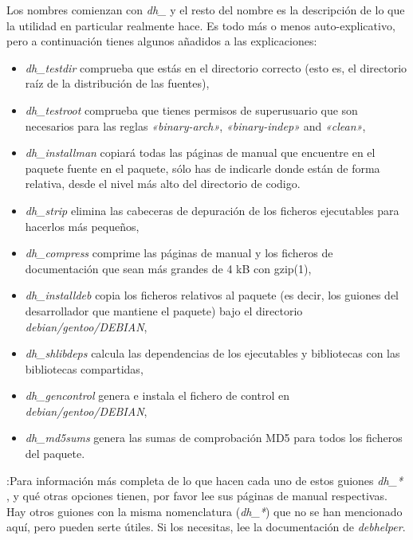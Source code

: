 \documentclass[letterpaper,12pt,spanish]{manual}
\begin{document}
Los nombres comienzan con \emph{dh\_} y el resto del nombre es la descripción de lo que la utilidad en particular realmente hace. Es todo más o menos auto-explicativo, pero a continuación tienes algunos añadidos a las explicaciones:
\begin{itemize}
\item {} 
\emph{dh\_testdir} comprueba que estás en el directorio correcto (esto es, el directorio raíz de la distribución de las fuentes),

\item {} 
\emph{dh\_testroot} comprueba que tienes permisos de superusuario que son necesarios para las reglas \emph{«binary-arch»}, \emph{«binary-indep»} and \emph{«clean»},

\item {} 
\emph{dh\_installman} copiará todas las páginas de manual que encuentre en el paquete fuente en el paquete, sólo has de indicarle donde están de forma relativa, desde el nivel más alto del directorio de codigo.

\item {} 
\emph{dh\_strip} elimina las cabeceras de depuración de los ficheros ejecutables para hacerlos más pequeños,

\item {} 
\emph{dh\_compress} comprime las páginas de manual y los ficheros de documentación que sean más grandes de 4 kB con gzip(1),

\item {} 
\emph{dh\_installdeb} copia los ficheros relativos al paquete (es decir, los guiones del desarrollador que mantiene el paquete) bajo el directorio \emph{debian/gentoo/DEBIAN},

\item {} 
\emph{dh\_shlibdeps} calcula las dependencias de los ejecutables y bibliotecas con las bibliotecas compartidas,

\item {} 
\emph{dh\_gencontrol} genera e instala el fichero de control en \emph{debian/gentoo/DEBIAN},

\item {} 
\emph{dh\_md5sums} genera las sumas de comprobación MD5 para todos los ficheros del paquete.

\end{itemize}

:Para información más completa de lo que hacen cada uno de estos guiones \emph{dh\_*} , y qué otras opciones tienen, por favor lee sus páginas de manual respectivas. Hay otros guiones con la misma nomenclatura (\emph{dh\_*}) que no se han mencionado aquí, pero pueden serte útiles. Si los necesitas, lee la documentación de \emph{debhelper}.
\end{document}
